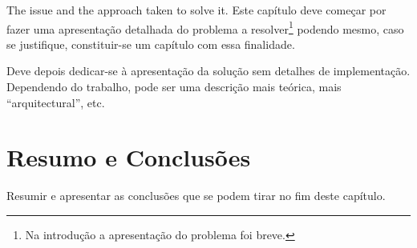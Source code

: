 The issue and the approach taken to solve it.
Este capítulo deve começar por fazer uma apresentação detalhada do
problema a resolver\footnote{Na introdução a apresentação do
  problema foi breve.} podendo mesmo, caso se justifique,
constituir-se um capítulo com essa finalidade.

Deve depois dedicar-se à apresentação da solução sem detalhes de
implementação. 
Dependendo do trabalho, pode ser uma descrição mais teórica, mais
``arquitectural'', etc.
\clearpage
\section{Resumo e Conclusões}

Resumir e apresentar as conclusões que se podem tirar no fim deste
capítulo.
